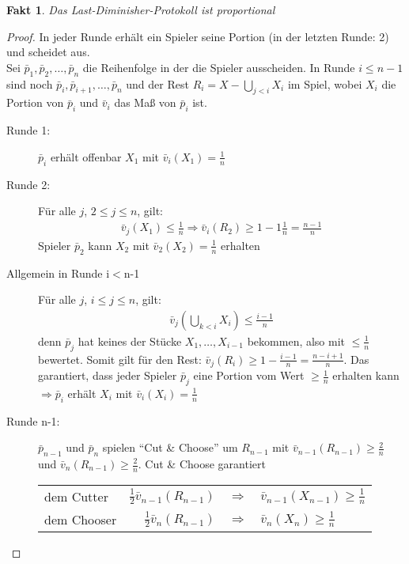 \documentclass[a4paper,10pt]{scrartcl}
\newtheorem*{fakt}{Fakt}
\begin{document}
\begin{fakt}
 Das Last-Diminisher-Protokoll ist proportional
\end{fakt}
\begin{proof}
 In jeder Runde erhält ein Spieler seine Portion (in der letzten Runde: 2) und scheidet aus.\\
 Sei $\bar {p}_1,\bar{p}_2,\ldots,\bar p_n$ die Reihenfolge in der die Spieler ausscheiden. In Runde $i\leq n-1$ sind noch $\bar p_i,
 \bar p_{i+1},\ldots,\bar p_n $ und der Rest $R_i=X-\bigcup\limits_{j<i}X_i$ im Spiel, wobei $X_i$ die Portion von $\bar p_i$ und 
 $\bar v_i$ das Maß von $\bar p_i$ ist.
 \begin{description}
  \item[Runde 1:] $\bar p_i $ erhält offenbar $X_1$ mit $\bar v_i(X_1)=\frac{1}{n}$
  \item[Runde 2:] Für alle $j$, $2\leq j\leq n$, gilt: \begin{align*}
                   \bar v_j(X_1)\leq\frac{1}{n}\Rightarrow\bar v_i(R_2)\geq1-1\frac{1}{n}=\frac{n-1}{n}
                  \end{align*}
                  Spieler $\bar p_2$ kann $X_2$ mit $\bar v_2(X_2)=\frac{1}{n}$ erhalten
   \item[Allgemein in Runde i$<$n-1] Für alle $j$, $i\leq j\leq n$, gilt:
    \begin{align*} 
     \bar v_j(\bigcup\limits_{k<i}X_i)\leq\frac{i-1}{n}
    \end{align*}
     denn $\bar p_j$ hat keines der Stücke $X_1,\ldots,X_{i-1}$ bekommen, also mit $\leq\frac{1}{n}$ bewertet. Somit gilt für den Rest:
     $\bar v_j(R_i)\geq1-\frac{i-1}{n}=\frac{n-i+1}{n}$. Das garantiert, dass jeder Spieler $\bar p_j$ eine Portion vom Wert $\geq\frac{1}{n}$
     erhalten kann $\Rightarrow\bar p_i$ erhält $X_i$ mit $\bar v_i(X_i)=\frac{1}{n}$
   \item[Runde n-1:] $\bar p_{n-1}$ und $\bar p_n$ spielen ``Cut \& Choose'' um $R_{n-1}$ mit $\bar v_{n-1}(R_{n-1})\geq\frac{2}{n}$
                       und $\bar v_n(R_{n-1})\geq\frac{2}{n}$. Cut \& Choose garantiert\\
                       \begin{tabular}{lrcl}
                       dem Cutter&$\frac{1}{2}\bar v_{n-1}(R_{n-1})$&$\Rightarrow$&$\bar v_{n-1}(X_{n-1})\geq\frac{1}{n}$\\
                       dem Chooser&$\frac{1}{2}\bar v_{n}(R_{n-1})$&$\Rightarrow$&$\bar v_{n}(X_{n})\geq\frac{1}{n}$
                       \end{tabular}
 \end{description}
\end{proof}
\end{document}
